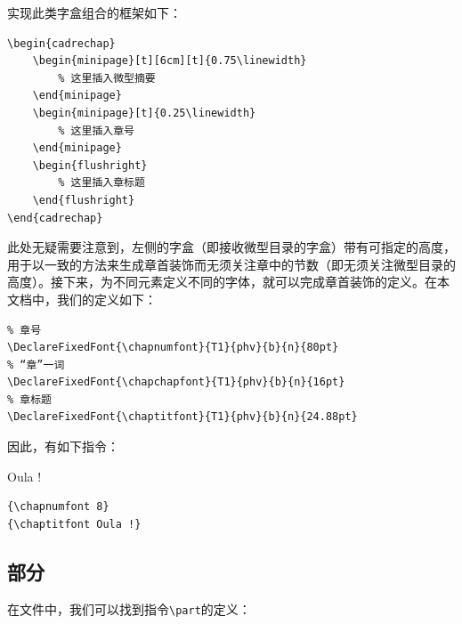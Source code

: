 
实现此类字盒组合的框架如下：

\begin{dmd}
\begin{verbatim}
\begin{cadrechap}
    \begin{minipage}[t][6cm][t]{0.75\linewidth}
        % 这里插入微型摘要 
    \end{minipage} 
    \begin{minipage}[t]{0.25\linewidth}
        % 这里插入章号
    \end{minipage}
    \begin{flushright}
        % 这里插入章标题
    \end{flushright}
\end{cadrechap}\end{verbatim}
\end{dmd}

此处无疑需要注意到，左侧的字盒（即接收微型目录的字盒）带有可指定的高度，用于以一致的方法来生成章首装饰而无须关注章中的节数（即无须关注微型目录的高度）。接下来，为不同元素定义不同的字体，就可以完成章首装饰的定义。在本文档中，我们的定义如下：

\begin{dmd}
\begin{verbatim}
% 章号
\DeclareFixedFont{\chapnumfont}{T1}{phv}{b}{n}{80pt}
% “章”一词
\DeclareFixedFont{\chapchapfont}{T1}{phv}{b}{n}{16pt}
% 章标题
\DeclareFixedFont{\chaptitfont}{T1}{phv}{b}{n}{24.88pt}\end{verbatim}
\end{dmd}


因此，有如下指令：

\begin{codelist}[10.2]{
    {}
    {\chaptitfont Oula !}
}
\begin{verbatim}
{\chapnumfont 8}
{\chaptitfont Oula !}\end{verbatim}
\end{codelist}

\subsection{部分}

在文件中，我们可以找到指令\verb|\part|的定义：

